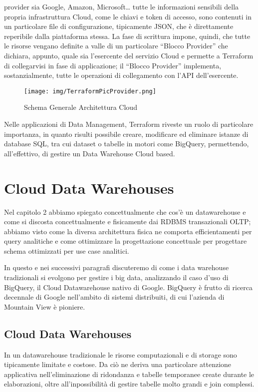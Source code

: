 \documentclass[a4paper,12pt]{report}
\begin{document}
provider sia Google, Amazon, Microsoft… tutte le informazioni sensibili della propria infrastruttura Cloud, come le chiavi e token di accesso, sono contenuti in un particolare file di configurazione, tipicamente JSON, che è direttamente reperibile dalla piattaforma stessa. La fase di scrittura impone, quindi, che tutte le risorse vengano definite a valle di un particolare “Blocco Provider” che dichiara, appunto, quale sia l’esercente del servizio Cloud e permette a Terraform di collegarvisi in fase di applicazione; il “Blocco Provider” implementa, sostanzialmente, tutte le operazioni di collegamento con l’API dell’esercente.

\begin{figure}[h]
    \centering
    \texttt{[image: img/TerraformPicProvider.png]}
    \caption{Schema Generale Architettura Cloud}
\end{figure}

\noindent
Nelle applicazioni di Data Management, Terraform riveste un ruolo di particolare importanza, in quanto risulti possibile creare, modificare ed eliminare istanze di database SQL, tra cui dataset o tabelle in motori come BigQuery, permettendo, all’effettivo, di gestire un Data Warehouse Cloud based.
\section{Cloud Data Warehouses}
Nel capitolo 2 abbiamo spiegato concettualmente che cos’è un datawarehouse e come si discosta concettualmente e fisicamente dai RDBMS transazionali OLTP; abbiamo visto come la diversa architettura fisica ne comporta efficientamenti per query analitiche e come ottimizzare la progettazione concettuale per progettare schema ottimizzati per use case analitici.

\noindent
In questo e nei successivi paragrafi discuteremo di come i data warehouse tradizionali si evolgono per gestire i big data, analizzando il caso d'uso di BigQuery, il Cloud Datawarehouse nativo di Google. BigQuery è frutto di ricerca decennale di Google nell'ambito di sistemi distribuiti, di cui l'azienda di Mountain View è pioniere.

\subsection{Cloud Data Warehouses}

In un datawarehouse tradizionale le risorse computazionali e di storage sono tipicamente  limitate e costose. Da ciò ne deriva una particolare attenzione applicativa nell’eliminazione di ridondanza e tabelle temporanee create durante le elaborazioni, oltre all’inpossibilità di gestire tabelle molto grandi e join complessi.
\end{document}

